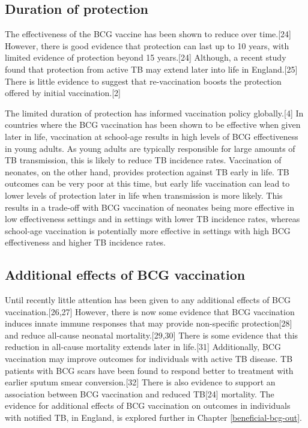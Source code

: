 \documentclass[11pt,twoside]{bristolthesis}
\begin{document}
  \hypertarget{duration-of-protection}{%
  \subsection{Duration of protection}\label{duration-of-protection}}
  
  The effectiveness of the BCG vaccine has been shown to reduce over time.{[}24{]} However, there is good evidence that protection can last up to 10 years, with limited evidence of protection beyond 15 years.{[}24{]} Although, a recent study found that protection from active TB may extend later into life in England.{[}25{]} There is little evidence to suggest that re-vaccination boosts the protection offered by initial vaccination.{[}2{]}
  
  The limited duration of protection has informed vaccination policy globally.{[}4{]} In countries where the BCG vaccination has been shown to be effective when given later in life, vaccination at school-age results in high levels of BCG effectiveness in young adults. As young adults are typically responsible for large amounts of TB transmission, this is likely to reduce TB incidence rates. Vaccination of neonates, on the other hand, provides protection against TB early in life. TB outcomes can be very poor at this time, but early life vaccination can lead to lower levels of protection later in life when transmission is more likely. This results in a trade-off with BCG vaccination of neonates being more effective in low effectiveness settings and in settings with lower TB incidence rates, whereas school-age vaccination is potentially more effective in settings with high BCG effectiveness and higher TB incidence rates.
  
  \hypertarget{additional-effects-of-bcg-vaccination}{%
  \subsection{Additional effects of BCG vaccination}\label{additional-effects-of-bcg-vaccination}}
  
  Until recently little attention has been given to any additional effects of BCG vaccination.{[}26,27{]} However, there is now some evidence that BCG vaccination induces innate immune responses that may provide non-specific protection{[}28{]} and reduce all-cause neonatal mortality.{[}29,30{]} There is some evidence that this reduction in all-cause mortality extends later in life.{[}31{]} Additionally, BCG vaccination may improve outcomes for individuals with active TB disease. TB patients with BCG scars have been found to respond better to treatment with earlier sputum smear conversion.{[}32{]} There is also evidence to support an association between BCG vaccination and reduced TB{[}24{]} mortality. The evidence for additional effects of BCG vaccination on outcomes in individuals with notified TB, in England, is explored further in Chapter \ref{beneficial-bcg-out}.
  
\end{document}
